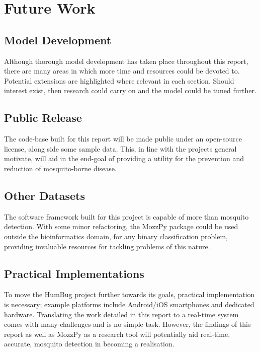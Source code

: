 \section{Future Work}
\label{sec:conc-future}
    \subsection{Model Development}
    \label{subsec:conc-future-dev}
        Although thorough model development has taken place throughout this report, there are many areas in which more time and resources could be devoted to. Potential extensions are highlighted where relevant in each section. Should interest exist, then research could carry on and the model could be tuned further. 
    \subsection{Public Release}
    \label{subsec:conc-future-public}
        The code-base built for this report will be made public under an open-source license, along side some sample data. This, in line with the projects general motivate, will aid in the end-goal of providing a utility for the prevention and reduction of mosquito-borne disease.

    \subsection{Other Datasets}
    \label{subsec:conc-future-datasets}
        The software framework built for this project is capable of more than mosquito detection. With some minor refactoring, the MozzPy package could be used outside the bioinformatics domain, for any binary classification problem, providing invaluable resources for tackling problems of this nature. 
        
    \subsection{Practical Implementations}
    \label{subsec:conc-future-prac}
        To move the HumBug project further towards its goals, practical implementation is necessary; example platforms include Android/iOS smartphones and dedicated hardware. Translating the work detailed in this report to a real-time system comes with many challenges and is no simple task. However, the findings of this report as well as MozzPy as a research tool will potentially aid real-time, accurate, mosquito detection in becoming a realisation.
    